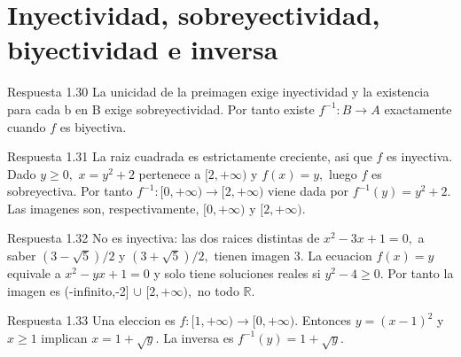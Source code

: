 \documentclass[10pt,a4paper,oneside,openany]{book}
\begin{document}
\section{Inyectividad, sobreyectividad, biyectividad e inversa}
\begin{PSevenAnswerFixed}{Respuesta 1.30}
La unicidad de la preimagen exige inyectividad y la existencia para cada b en B exige sobreyectividad. Por tanto existe \(f^{-1}:B\to A\) exactamente cuando \(f\) es biyectiva.
\end{PSevenAnswerFixed}
\begin{PSevenAnswerFixed}{Respuesta 1.31}
La raiz cuadrada es estrictamente creciente, asi que \(f\) es inyectiva. Dado \(y\ge 0,\) \(x=y^{2}+2\) pertenece a \([2,+\infty )\) y \(f(x)=y,\) luego \(f\) es sobreyectiva. Por tanto \(f^{-1}:[0,+\infty )\to [2,+\infty )\) viene dada por \(f^{-1}(y)=y^{2}+2\). Las imagenes son, respectivamente, \([0,+\infty )\) y \([2,+\infty )\).
\end{PSevenAnswerFixed}
\begin{PSevenAnswerFixed}{Respuesta 1.32}
No es inyectiva: las dos raices distintas de \(x^{2}-3x+1=0,\) a saber \((3-\sqrt{5})/2\) y \((3+\sqrt{5})/2,\) tienen imagen \(3\). La ecuacion \(f(x)=y\) equivale a \(x^{2}-yx+1=0\) y solo tiene soluciones reales si \(y^{2}-4\ge 0\). Por tanto la imagen es (-infinito,-2] \(\cup \) \([2,+\infty ),\) no todo \(\mathbb{R}\).
\end{PSevenAnswerFixed}
\begin{PSevenAnswerFixed}{Respuesta 1.33}
Una eleccion es \(f:[1,+\infty )\to [0,+\infty )\). Entonces \(y=(x-1)^{2}\) y \(x\ge 1\) implican \(x=1+\sqrt{y}\). La inversa es \(f^{-1}(y)=1+\sqrt{y}\).
\end{PSevenAnswerFixed}
\end{document}
